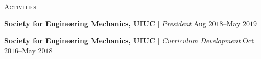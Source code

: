 \documentclass[10pt]{article}
\begin{document}
\vspace{-1.5em}
\begin{multicols}{2}
\textsc{Activities}
\columnbreak

\textbf{Society for Engineering Mechanics, UIUC} $|$ \textit{President} \hfill Aug $2018$--May $2019$

\vspace{-0.75em}

%
\textbf{Society for Engineering Mechanics, UIUC} $|$ \textit{Curriculum Development} \hfill Oct $2016$--May $2018$

%
\end{multicols}
\vspace{-1.5em} 
\end{document}
